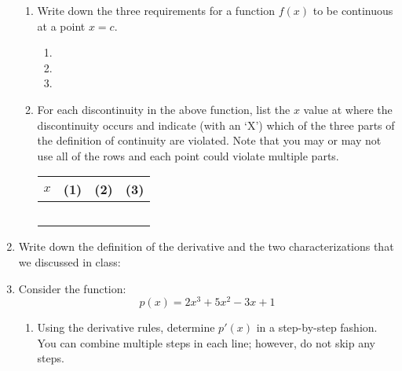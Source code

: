 \documentclass[letterpaper,12pt,fleqn]{article}
\begin{document}
\begin{enumerate}[left=0pt]
  \begin{enumerate}
  \item Write down the three requirements for a function \(f(x)\) to be continuous at a point \(x=c\).
    \begin{enumerate}[label={\arabic*)}]
    \item
    \item
    \item
    \end{enumerate}

    \bigskip
    
  \item For each discontinuity in the above function, list the \(x\) value at where the discontinuity occurs and indicate
    (with an `X') which of the three parts of the definition of continuity are violated.  Note that you may or may not use all
    of the rows and each point could violate multiple parts.

    \bigskip

    \begin{tabular}{|p{0.5in}|c|c|c|}
      \hline
      \(x\) & (1) & (2) & (3) \\
      \hline
      & & & \\
      \hline
      & & & \\
      \hline
      & & & \\
      \hline
      & & & \\
      \hline
      & & & \\
      \hline
    \end{tabular}
  \end{enumerate}

  \newpage

\item Write down the definition of the derivative and the two characterizations that we discussed in class:

  \bigskip

\item Consider the function:
  \[p(x)=2x^3+5x^2-3x+1\]
  \begin{enumerate}
  \item Using the derivative rules, determine \(p'(x)\) in a step-by-step fashion.  You can combine multiple steps in each
    line; however, do not skip any steps.


\end{enumerate}
\end{enumerate}
\end{document}
